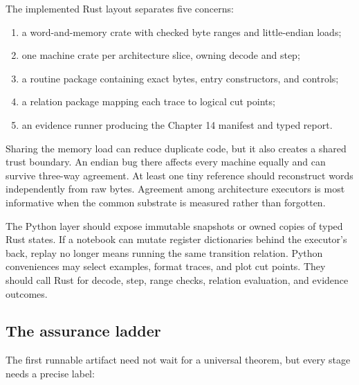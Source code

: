 The implemented Rust layout separates five concerns:

\begin{enumerate}
\item a word-and-memory crate with checked byte ranges and little-endian loads;
\item one machine crate per architecture slice, owning decode and step;
\item a routine package containing exact bytes, entry constructors, and
      controls;
\item a relation package mapping each trace to logical cut points;
\item an evidence runner producing the Chapter 14 manifest and typed report.
\end{enumerate}

Sharing the memory load can reduce duplicate code, but it also creates a
shared trust boundary. An endian bug there affects every machine equally and
can survive three-way agreement. At least one tiny reference should reconstruct
words independently from raw bytes. Agreement among architecture executors is
most informative when the common substrate is measured rather than forgotten.

The Python layer should expose immutable snapshots or owned copies of typed
Rust states. If a notebook can mutate register dictionaries behind the
executor's back, replay no longer means running the same transition relation.
Python conveniences may select examples, format traces, and plot cut points.
They should call Rust for decode, step, range checks, relation evaluation, and
evidence outcomes.

\subsection{The assurance ladder}

The first runnable artifact need not wait for a universal theorem, but every
stage needs a precise label:

